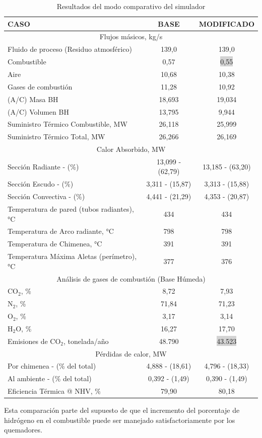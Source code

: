 \begin{table}[H]
\caption{Resultados del modo comparativo del simulador}
\label{tbl:comparison-r} \centering \begin{tabular}{l|c|c}
\quad\quad\quad CASO & BASE & MODIFICADO \\
\hline
\multicolumn{3}{c}{Flujos másicos,  kg/s} \\
Fluido de proceso (Residuo atmosférico)   &139,0         &139,0  \\
Combustible           &0,57 &\colorbox{lightgray}{0,55} \\
Aire                  &10,68         &10,38  \\
Gases de combustión   &11,28         &10,92  \\
\hline
(A/C) Masa BH        &18,693 &19,034 \\
(A/C) Volumen BH     &13,795 &9,944  \\
\hline
Suministro Térmico Combustible,  MW  &26,118 &25,999 \\
Suministro Térmico Total,  MW        &26,266 &26,169 \\
\hline
\multicolumn{3}{c}{Calor Absorbido,  MW}\\
Sección Radiante - (\%)  &13,099 - (62,79) &13,185 - (63,20)\\
Sección Escudo - (\%)    &3,311 - (15,87)  &3,313 - (15,88) \\
Sección Convectiva - (\%)&4,441 - (21,29)  &4,353 - (20,87) \\
\hline
Temperatura de pared (tubos radiantes), °C &434  &434  \\
Temperatura de Arco radiante, °C         &798  &798  \\
Temperatura de Chimenea, °C              &391  &391  \\
Temperatura Máxima Aletas (perímetro), °C &377  &376  \\
\hline
\multicolumn{3}{c}{Análisis de gases de combustión (Base Húmeda)}\\
CO$_2$, \%     &8,72    &7,93    \\
N$_2$, \%      &71,84   &71,23   \\
O$_2$, \%      &3,17    &3,14    \\
H$_2$O, \%     &16,27   &17,70   \\
\hline
Emisiones de CO$_2$, tonelada/año &48.790  &\colorbox{lightgray}{43.523} \\
\hline
\multicolumn{3}{c}{Pérdidas de calor,  MW}\\
Por chimenea - (\% del total)&4,888 - (18,61) &4,796 - (18,33) \\
Al ambiente - (\% del total) &0,392 - (1,49)  &0,390 - (1,49) \\
\hline
Eficiencia Térmica @ NHV, \%  &79,90 &80,18 \\
\end{tabular} \end{table}
\par Esta comparación parte del supuesto de que el incremento del porcentaje de hidrógeno en el combustible puede ser manejado satisfactoriamente por los quemadores.

